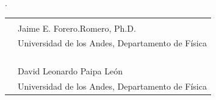


\newpage
.
\vspace{10cm}


\begin{tabular}{@{}p{.5in}p{4in}@{}}
& \hrulefill \\
& Jaime E. Forero.Romero, Ph.D. \\
& Universidad de los Andes, Departamento de Física\\
& \\
& \\
& \\
& \hrulefill \\
& David Leonardo Paipa León \\
& Universidad de los Andes, Departamento de Física\\

\end{tabular}






















